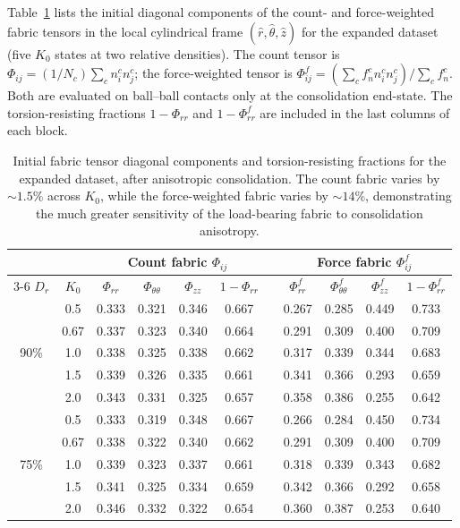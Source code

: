 \documentclass[a4paper,fleqn]{cas-sc}
\newcommand{\Kzero}{\ensuremath{K_0}}
\begin{document}
Table~\ref{tab:fabric_diagonal} lists the initial diagonal components of the count- and force-weighted fabric tensors in the local cylindrical frame $(\hat{r},\hat{\theta},\hat{z})$ for the expanded dataset (five \Kzero{} states at two relative densities). The count tensor is $\Phi_{ij} = (1/N_c)\sum_c n_i^c n_j^c$; the force-weighted tensor is $\Phi^f_{ij} = (\sum_c f_n^c n_i^c n_j^c) / \sum_c f_n^c$. Both are evaluated on ball--ball contacts only at the consolidation end-state. The torsion-resisting fractions $1 - \Phi_{rr}$ and $1 - \Phi^f_{rr}$ are included in the last columns of each block.

\begin{table}[h]
\centering
\caption{Initial fabric tensor diagonal components and torsion-resisting fractions for the expanded dataset, after anisotropic consolidation. The count fabric varies by ${\sim}1.5\%$ across \Kzero{}, while the force-weighted fabric varies by ${\sim}14\%$, demonstrating the much greater sensitivity of the load-bearing fabric to consolidation anisotropy.}
\label{tab:fabric_diagonal}
\small
\setlength{\tabcolsep}{4pt}
\begin{tabular}{ccccccccccc}
\toprule
& & \multicolumn{4}{c}{Count fabric $\Phi_{ij}$} & & \multicolumn{4}{c}{Force fabric $\Phi^f_{ij}$} \\
\cmidrule{3-6} \cmidrule{8-11}
$D_r$ & \Kzero{} & $\Phi_{rr}$ & $\Phi_{\theta\theta}$ & $\Phi_{zz}$ & $1{-}\Phi_{rr}$ & & $\Phi^f_{rr}$ & $\Phi^f_{\theta\theta}$ & $\Phi^f_{zz}$ & $1{-}\Phi^f_{rr}$ \\
\midrule
\multirow{5}{*}{90\%}
& 0.5  & 0.333 & 0.321 & 0.346 & 0.667 & & 0.267 & 0.285 & 0.449 & 0.733 \\
& 0.67 & 0.337 & 0.323 & 0.340 & 0.664 & & 0.291 & 0.309 & 0.400 & 0.709 \\
& 1.0  & 0.338 & 0.325 & 0.338 & 0.662 & & 0.317 & 0.339 & 0.344 & 0.683 \\
& 1.5  & 0.339 & 0.326 & 0.335 & 0.661 & & 0.341 & 0.366 & 0.293 & 0.659 \\
& 2.0  & 0.343 & 0.331 & 0.325 & 0.657 & & 0.358 & 0.386 & 0.255 & 0.642 \\
\midrule
\multirow{5}{*}{75\%}
& 0.5  & 0.333 & 0.319 & 0.348 & 0.667 & & 0.266 & 0.284 & 0.450 & 0.734 \\
& 0.67 & 0.338 & 0.322 & 0.340 & 0.662 & & 0.291 & 0.309 & 0.400 & 0.709 \\
& 1.0  & 0.339 & 0.323 & 0.337 & 0.661 & & 0.318 & 0.339 & 0.343 & 0.682 \\
& 1.5  & 0.341 & 0.325 & 0.334 & 0.659 & & 0.342 & 0.366 & 0.292 & 0.658 \\
& 2.0  & 0.346 & 0.332 & 0.322 & 0.654 & & 0.360 & 0.387 & 0.253 & 0.640 \\
\bottomrule
\end{tabular}
\end{table}




\end{document}
